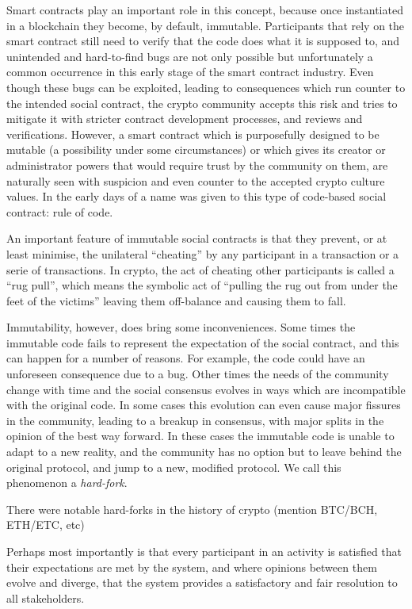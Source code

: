 Smart contracts play an important role in this concept, because once instantiated in a blockchain they become, by default, immutable. Participants that rely on the smart contract still need to verify that the code does what it is supposed to, and unintended and hard-to-find bugs are not only possible but unfortunately a common occurrence in this early stage of the smart contract industry. Even though these bugs can be exploited, leading to consequences which run counter to the intended social contract, the crypto community accepts this risk and tries to mitigate it with stricter contract development processes, and reviews and verifications. However, a smart contract which is purposefully designed to be mutable (a possibility under some circumstances) or which gives its creator or administrator powers that would require trust by the community on them, are naturally seen with suspicion and even counter to the accepted crypto culture values. In the early days of  a name was given to this type of code-based social contract: rule of code.

An important feature of immutable social contracts is that they prevent, or at least minimise, the unilateral ``cheating'' by any participant in a transaction or a serie of transactions. In crypto, the act of cheating other participants is called a ``rug pull'', which means the symbolic act of ``pulling the rug out from under the feet of the victims'' leaving them off-balance and causing them to fall.

Immutability, however, does bring some inconveniences. Some times the immutable code fails to represent the expectation of the social contract, and this can happen for a number of reasons. For example, the code could have an unforeseen consequence due to a bug. Other times the needs of the community change with time and the social consensus evolves in ways which are incompatible with the original code. In some cases this evolution can even cause major fissures in the community, leading to a breakup in consensus, with major splits in the opinion of the best way forward. In these cases the immutable code is unable to adapt to a new reality, and the community has no option but to leave behind the original protocol, and jump to a new, modified protocol. We call this phenomenon a \emph{hard-fork}.

There were notable hard-forks in the history of crypto (mention BTC/BCH, ETH/ETC, etc)

Perhaps most importantly is that every participant in an activity is satisfied that their expectations are met by the system, and where opinions between them evolve and diverge, that the system provides a satisfactory and fair resolution to all stakeholders. 

